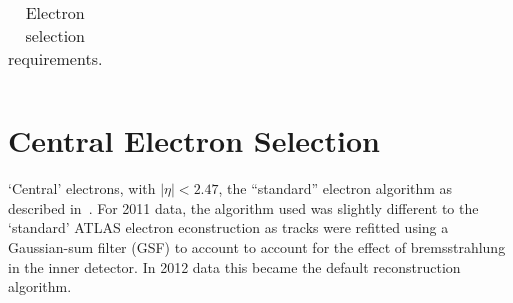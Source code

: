 \begin{table}[!htbp]
\begin{tabular}{ l  l l }
    \hline \hline
  \end{tabular}
   \caption{Electron selection requirements.}
   \label{table:objsel-el}
\end{table}

\section{Central Electron Selection}

`Central' electrons, with $|\eta|<2.47$, the ``standard'' electron algorithm as
described in~.  For 2011 data, the algorithm used was slightly
different to the `standard' ATLAS electron econstruction as tracks were refitted
using a Gaussian-sum filter (GSF) to account to account for the effect of
bremsstrahlung in the inner detector. In 2012 data this became the default
reconstruction algorithm.

